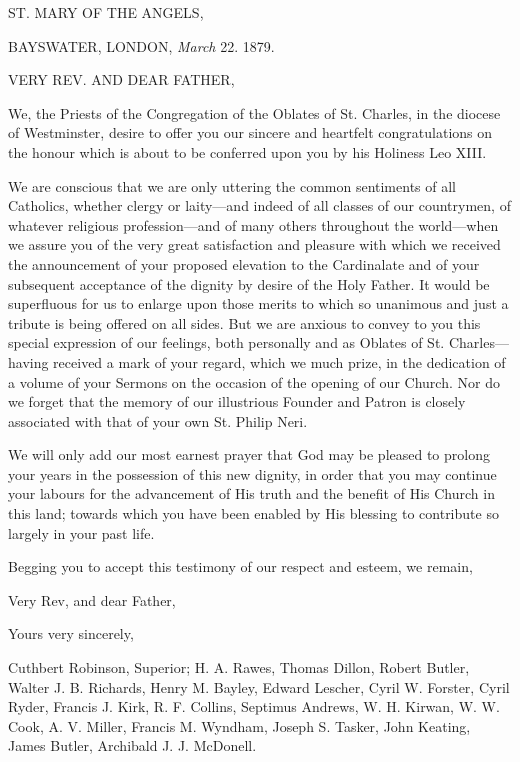 ST. MARY OF
THE ANGELS,

BAYSWATER, LONDON, \emph{March}
22. 1879.

VERY REV. AND
DEAR FATHER,

We, the Priests of the Congregation of the Oblates of St. Charles, in
the diocese of Westminster, desire to offer you our sincere and
heartfelt congratulations on the honour which is about to be conferred
upon you by his Holiness Leo XIII.

We are conscious that we are only uttering the common sentiments of
all Catholics, whether clergy or laity—and indeed of all classes of
our countrymen, of whatever religious profession—and of many others
throughout the world—when we assure you of the very great
satisfaction and pleasure with which we received the announcement of
your proposed elevation to the Cardinalate and of your subsequent
acceptance of the dignity by desire of the Holy Father. It would be
superfluous for us to enlarge upon those merits to which so unanimous
and just a tribute is being offered on all sides. But we are anxious
to convey to you this special expression of our feelings, both
personally and as Oblates of St. Charles—having received a mark of
your regard, which we much prize, in the dedication of a volume of
your Sermons on the occasion of the opening of our Church. Nor do we
forget that the memory of our illustrious Founder and Patron is
closely associated with that of your own St. Philip Neri.

We will only add our most earnest prayer that God may be pleased to
prolong your years in the possession of this new dignity, in order
that you may continue your labours for the advancement of His truth
and the benefit of His Church in this land; towards which you have
been enabled by His blessing to contribute so largely in your past
life.

Begging you to accept this testimony of our respect and esteem, we
remain,

Very Rev, and dear Father,

Yours very sincerely,

Cuthbert Robinson, Superior; H. A. Rawes, Thomas
Dillon, Robert Butler, Walter J. B. Richards, Henry M. Bayley, Edward
Lescher, Cyril W. Forster, Cyril Ryder, Francis J. Kirk, R. F.
Collins, Septimus Andrews, W. H. Kirwan, W. W. Cook, A. V. Miller,
Francis M. Wyndham, Joseph S. Tasker, John Keating, James Butler,
Archibald J. J. McDonell.


